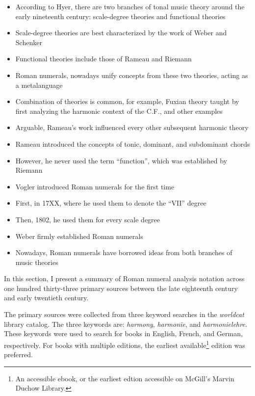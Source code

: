 
\begin{itemize}
    \item According to Hyer, there are two branches of tonal music theory around the early nineteenth century: scale-degree theories and functional theories
    \item Scale-degree theories are best characterized by the work of Weber and Schenker
    \item Functional theories include those of Rameau and Riemann
    \item Roman numerals, nowadays unify concepts from these two theories, acting as a metalanguage
    \item Combination of theories is common, for example, Fuxian theory taught by first analyzing the harmonic context of the C.F., and other examples
    \item Arguable, Rameau's work influenced every other subsequent harmonic theory
    \item Rameau introduced the concepts of tonic, dominant, and subdominant chords
    \item However, he never used the term ``function'', which was established by Riemann
    \item Vogler introduced Roman numerals for the first time
    \item First, in 17XX, where he used them to denote the ``VII'' degree
    \item Then, 1802, he used them for every scale degree
    \item Weber firmly established Roman numerals
    \item Nowadays, Roman numerals have borrowed ideas from both branches of music theories
\end{itemize}

In this section, I present a summary of Roman numeral analysis notation across one hundred thirty-three primary sources between the late eighteenth century and early twentieth century.

The primary sources were collected from three keyword searches in the \emph{worldcat} library catalog.
The three keywords are: \emph{harmony}, \emph{harmonie}, and \emph{harmonielehre}.
These keywords were used to search for books in English, French, and German, respectively.
For books with multiple editions, the earliest available\footnote{An accessible ebook, or the earliest edtion accessible on McGill's Marvin Duchow Library.} edition was preferred.

